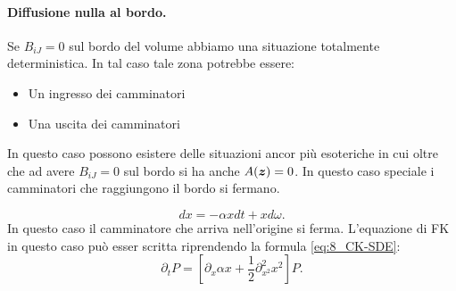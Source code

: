 \paragraph{Diffusione nulla al bordo.}%
Se $B_{iJ} = 0$ sul bordo del volume abbiamo una situazione totalmente deterministica. In tal caso tale zona potrebbe essere: 
\begin{itemize}
    \item Un ingresso dei camminatori
    \item Una uscita dei camminatori
\end{itemize}
In questo caso possono esistere delle situazioni ancor più esoteriche in cui oltre che ad avere $B_{iJ} = 0$ sul bordo si ha anche $A(\boldsymbol{z}) = 0$. In questo caso speciale i camminatori che raggiungono il bordo si fermano.
\begin{exmp}[]
    \[
        dx = -\alpha xdt + xd\omega
    .\] 
    In questo caso il camminatore che arriva nell'origine si ferma. L'equazione di FK in questo caso può esser scritta riprendendo la formula \ref{eq:8_CK-SDE}:
    \[
        \partial_{t}P = \left[\partial_{x}\alpha x + \frac{1}{2}\partial^2_{x^2} x^2\right] P
    .\] 
\end{exmp}
\noindent
